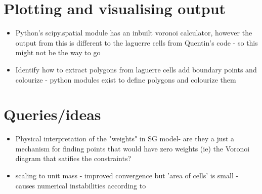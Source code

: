 \documentclass[]{article}
\begin{document}
 	\section{Plotting and visualising output}
 	\begin{itemize}
 		\item Python's scipy.spatial module has an inbuilt voronoi calculator, however the output from this is different to the laguerre cells from Quentin's code - so this might not be the way to go
 		\item Identify how to extract polygons from laguerre cells add boundary points and colourize - python modules exist to define polygons and colourize them 
 	\end{itemize}
	\section{Queries/ideas}
	\begin{itemize}
		\item Physical interpretation of 
		the "weights" in SG model- are they a just a mechanism for finding points that would have zero weights (ie) the Voronoi diagram that satifies the constraints?
		 \item scaling to unit mass - improved convergence but 'area of cells' is small - causes numerical instabilities according to \cite{Merigot2017}
	\end{itemize}
\newpage


\end{document}
